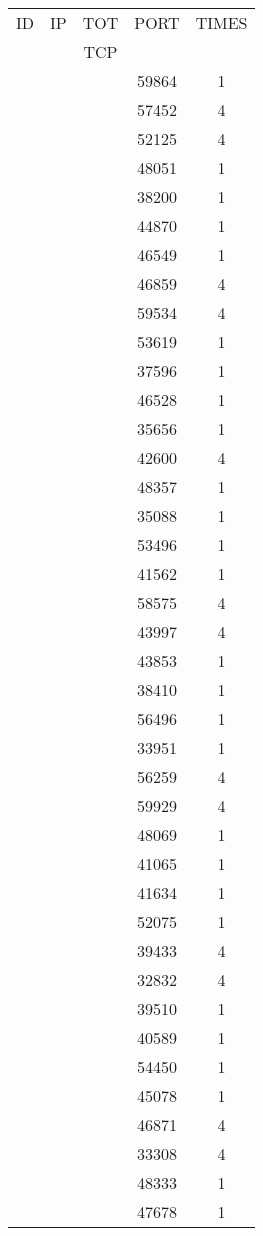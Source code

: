 \documentclass[a4paper]{scrartcl}
\begin{document}
\begin{minipage}[b]{0.5\linewidth}
\begin{tabular}{| c | c | c | c | c |}
\hline
ID & IP & TOT & PORT & TIMES \\ 
   &    & TCP &      &       \\ 
\hline
& & & 59864 & 1 \\ & & & 57452 & 4 \\ & & & 52125 & 4 \\ & & & 48051 & 1 \\ & & & 38200 & 1 \\ & & & 44870 & 1 \\ & & & 46549 & 1 \\ & & & 46859 & 4 \\ & & & 59534 & 4 \\ & & & 53619 & 1 \\ & & & 37596 & 1 \\ & & & 46528 & 1 \\ & & & 35656 & 1 \\ & & & 42600 & 4 \\ & & & 48357 & 1 \\ & & & 35088 & 1 \\ & & & 53496 & 1 \\ & & & 41562 & 1 \\ & & & 58575 & 4 \\ & & & 43997 & 4 \\ & & & 43853 & 1 \\ & & & 38410 & 1 \\ & & & 56496 & 1 \\ & & & 33951 & 1 \\ & & & 56259 & 4 \\ & & & 59929 & 4 \\ & & & 48069 & 1 \\ & & & 41065 & 1 \\ & & & 41634 & 1 \\ & & & 52075 & 1 \\ & & & 39433 & 4 \\ & & & 32832 & 4 \\ & & & 39510 & 1 \\ & & & 40589 & 1 \\ & & & 54450 & 1 \\ & & & 45078 & 1 \\ & & & 46871 & 4 \\ & & & 33308 & 4 \\ & & & 48333 & 1 \\ & & & 47678 & 1 \\ \hline\end{tabular}\end{minipage} \hfill\begin{minipage}[b]{0.5\linewidth}\begin{tabular}{| c | c | c | c | c |}

\end{tabular}
\end{minipage}
\end{document}
